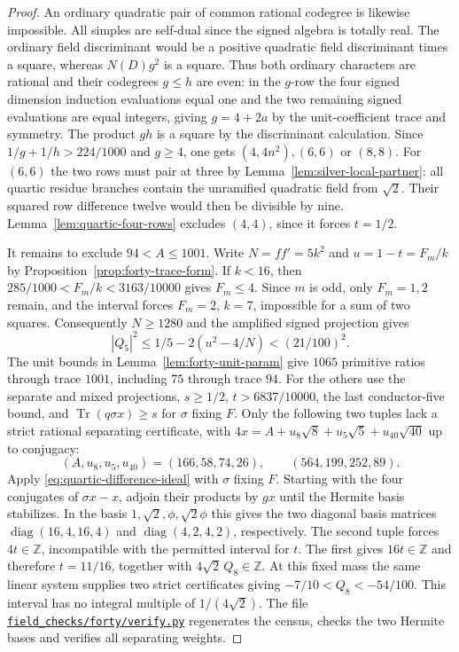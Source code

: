 \documentclass[11pt,reqno]{amsart}
\newcommand{\codefile}[1]{\href{https://github.com/sebastienpalcoux/grothendieck-ring-classification/blob/d5750105bb5758f3ad38d2e5464dfcc12c019816/supplements/rank6/sphericality/#1}{\nolinkurl{#1}}}
\theoremstyle{remark}\newtheorem{remark}[theorem]{Remark}
\numberwithin{equation}{section}
\begin{document}
\begin{proof}
An ordinary quadratic pair of common rational codegree is likewise
impossible. All simples are self-dual since the signed algebra is
totally real. The ordinary field discriminant would be a positive
quadratic field discriminant times a square, whereas $N(D)g^2$ is
a square. Thus both ordinary characters are rational and their
codegrees $g\le h$ are even: in the $g$-row the four signed
dimension induction evaluations equal one and the two remaining
signed evaluations are equal integers, giving $g=4+2a$ by the
unit-coefficient trace and symmetry. The product $gh$ is a square
by the discriminant calculation. Since $1/g+1/h>224/1000$ and $g\ge4$, one gets $(4,4n^2),(6,6)$ or $(8,8)$.
For $(6,6)$ the two rows must pair at three by
Lemma~\ref{lem:silver-local-partner}: all quartic residue branches
contain the unramified quadratic field from $\sqrt2$. Their squared
row difference twelve would then be divisible by nine. Lemma~\ref{lem:quartic-four-rows} excludes $(4,4)$, since it forces $t=1/2$.

It remains to exclude $94<A\le1001$. Write $N=ff'=5k^2$ and
$u=1-t=F_m/k$ by Proposition~\ref{prop:forty-trace-form}.
If $k<16$, then $285/1000<F_m/k<3163/10000$ gives $F_m\le4$.
Since $m$ is odd, only $F_m=1,2$ remain, and the interval forces
$F_m=2$, $k=7$, impossible for a sum of two squares. Consequently
$N\ge1280$ and the amplified signed projection gives
\[
  |Q_5|^2\le1/5-2(u^2-4/N)<(21/100)^2.
\]
The unit bounds in Lemma~\ref{lem:forty-unit-param} give $1065$
primitive ratios through trace $1001$, including $75$ through trace $94$. For the others use the
separate and mixed projections, $s\ge1/2$, $t>6837/10000$, the last
conductor-five bound, and $\operatorname{Tr}(q\sigma x)\ge s$ for
$\sigma$ fixing $F$. Only the following two tuples lack a strict
rational separating certificate, with $4x=A+u_8\sqrt8+u_5\sqrt5+u_{40}\sqrt{40}$
up to conjugacy:
\[
 (A,u_8,u_5,u_{40})=(166,58,74,26),\qquad(564,199,252,89).
\]
Apply \eqref{eq:quartic-difference-ideal} with $\sigma$ fixing $F$.
Starting with the four conjugates of $\sigma x-x$, adjoin their
products by $gx$ until the Hermite basis stabilizes. In the basis
$1,\sqrt2,\phi,\sqrt2\phi$ this gives the two diagonal basis
matrices $\operatorname{diag}(16,4,16,4)$ and
$\operatorname{diag}(4,2,4,2)$, respectively.
The second tuple forces $4t\in\mathbb Z$, incompatible with the permitted
interval for $t$. The first gives $16t\in\mathbb Z$ and therefore
$t=11/16$, together with $4\sqrt2\,Q_8\in\mathbb Z$. At this fixed
mass the same linear system supplies two strict certificates giving
$-7/10<Q_8<-54/100$. This interval has no integral multiple of
$1/(4\sqrt2)$. The file \codefile{field_checks/forty/verify.py} regenerates the
census, checks the two Hermite bases and verifies all separating weights.
\end{proof}
\end{document}
